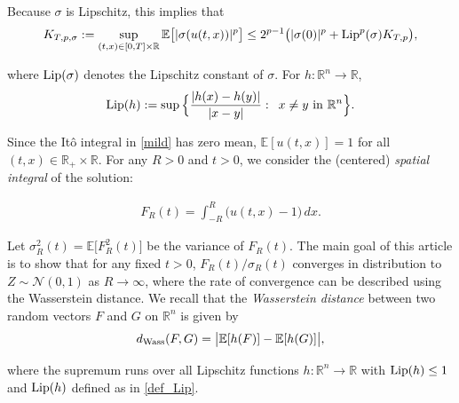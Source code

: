 \documentclass[letterpaper, 11pt,  reqno]{amsart}
\newcommand{\noi}{\noindent}
\newcommand{\R}{\mathbb{R}}
\newcommand{\bE}{\mathbb{E}}
\newcommand{\bR}{\mathbb{R}}
\newcommand{\E}{\mathbb{E}}
\newcommand{\cN}{\mathcal{N}}
\newcommand{\s}{\sigma}
\newcommand{\Lip}{\textup{Lip}}
\numberwithin{equation}{section}
\numberwithin{theorem}{section}
\begin{document}
\noi
Because $\s$ is Lipschitz, this implies that
\begin{align}\label{KTPs}
K_{T,p,\s}:= \sup_{(t,x)\in [0,T] \times \bR} \E\big[ | \s( u(t,x) ) |^p \big] 
 \leq 2^{p-1} \big(  |\s(0)|^p +  \Lip^p( \s)   K_{T,p} \big),
\end{align}

\noi 
where  $\textup{Lip}(\s)$ denotes the  Lipschitz constant of $\s$.
For $h:\R^n\to\R$,
\begin{align}\label{def_Lip}
\textup{Lip}(h):=\sup\Big\{ \frac{|h(x)-h(y)|}{|x-y|}:  \, \text{ $x\neq y$ in $\R^n$} \Big\}.
\end{align}



Since the It\^o integral in \eqref{mild}
 has zero mean, $\bE[u(t,x)]=1$ for all $(t,x) \in \bR_+ \times \bR$. 
 For any $R>0$ and $t>0$, we consider the (centered) {\em spatial integral} of the solution:

\noi
\begin{align}\label{FRT}
F_R(t) =  \int_{-R}^R \big( u(t,x) - 1 \big) \, dx.
\end{align}

Let $\sigma_R^{2}(t)=\bE\big[F_R^2(t)\big]$ be the variance of $F_R(t)$.
The main goal of this article is to show that for any fixed $t>0$, 
$F_R(t)/\s_R(t)$ converges in distribution to $Z \sim \cN(0,1)$
as $R \to \infty$, 
where the rate of convergence can be   described using the Wasserstein distance.
We recall that the {\em Wasserstein distance} between two random vectors $F$ and $G$
 on $\R^n$ is given by
\begin{align}\label{WASS_def}
d_{\rm Wass}(F,G)=  \big|\bE[h(F)]-\bE[h(G)]\big|,
\end{align}

\noi
where the supremum  runs over all  Lipschitz functions $h:\bR^{n}\to \bR$ with $\textup{Lip}(h) \leq 1$ and $\textup{Lip}(h)$ defined as in \eqref{def_Lip}.
\end{document}
